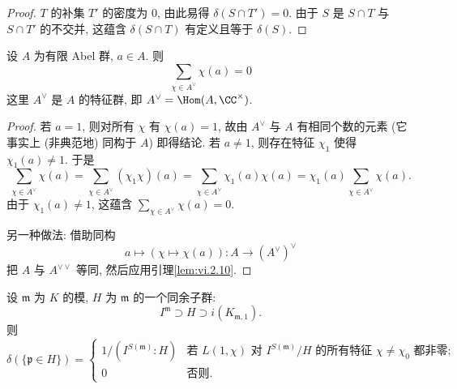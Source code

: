 \begin{proof}
$T$ 的补集 $T'$ 的密度为 $0$, 由此易得 $\delta(S\cap T')=0$. 由于 $S$ 是 $S\cap T$ 与 $S\cap T'$ 的不交并, 这蕴含 $\delta(S\cap T)$ 有定义且等于 $\delta(S)$.
\end{proof}

\begin{lemma}\label{lem:vi.4.7}
设 $A$ 为有限 Abel 群, $a\in A$. 则
\[
\sum_{\chi\in A^{\vee}}\chi(a)=0
\]
这里 $A^{\vee}$ 是 $A$ 的特征群, 即 $A^{\vee}=\Hom(A,\CC^{\times})$.
\end{lemma}

\begin{proof}
若 $a=1$, 则对所有 $\chi$ 有 $\chi(a)=1$, 故由 $A^{\vee}$ 与 $A$ 有相同个数的元素 (它事实上 (非典范地) 同构于 $A$) 即得结论. 若 $a\ne1$, 则存在特征 $\chi_1$ 使得 $\chi_1(a)\ne1$. 于是
\[
\sum_{\chi\in A^{\vee}}\chi(a)=\sum_{\chi\in A^{\vee}}(\chi_{1}\chi)(a)=\sum_{\chi\in A^{\vee}}\chi_{1}(a)\chi(a)=\chi_{1}(a)\sum_{\chi\in A^{\vee}}\chi(a).
\]
由于 $\chi_1(a)\ne1$, 这蕴含 $\sum_{\chi\in A^{\vee}}\chi(a)=0$.

另一种做法: 借助同构
\[
a\mapsto(\chi\mapsto\chi(a))\colon A\to(A^{\vee})^{\vee}
\]
把 $A$ 与 $A^{\vee\vee}$ 等同, 然后应用引理\ref{lem:vi.2.10}.
\end{proof}

\begin{theorem}\label{thm:vi.4.8}
设 $\mathfrak{m}$ 为 $K$ 的模, $H$ 为 $\mathfrak{m}$ 的一个同余子群:
\[
I^{\mathfrak{m}}\supset H\supset i(K_{\mathfrak{m},1}).
\]
则
\[
\delta(\{\mathfrak{p}\in H\})=
\begin{cases}
1/(I^{S(\mathfrak{m})}:H) & \text{若 $L(1,\chi)$ 对 $I^{S(\mathfrak{m})}/H$ 的所有特征 $\chi\ne\chi_0$ 都非零};\\
0 & \text{否则}.
\end{cases}
\]
\end{theorem}

